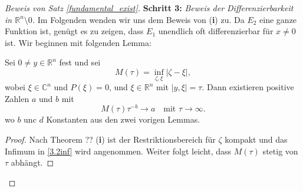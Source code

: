 \begin{proof}[Beweis von Satz \ref{fundamental_exist}]
\textbf{Schritt 3:} \emph{Beweis der Differenzierbarkeit in $\mathbb R^n\setminus{0}$.}
Im Folgenden wenden wir uns dem Beweis von ({\bf i}) zu. Da $E_2$ eine ganze Funktion ist, genügt es zu zeigen, dass $E_1$ unendlich oft differenzierbar für $x\neq 0$ ist.  Wir beginnen mit folgenden Lemma:
\begin{lem}\label{3.2lem1}
Sei $0\neq y \in \mathbb R^n$ fest und sei
\begin{equation}\label{3.2inf}
M(\tau) = \inf_{\zeta, \xi} |\zeta-\xi|,
\end{equation}
wobei $\xi\in \mathbb C^n$ und $P(\xi)=0$, und $\xi\in \mathbb R^n$ mit $|y, \xi|= \tau$. Dann existieren positive Zahlen $a$ und $b$ mit
\begin{equation}\label{3.2to}
M(\tau) \tau^{-b} \to a\quad \text{mit } \tau \to \infty.
\end{equation}
wo $b$ unc $d$ Konstanten aus den zwei vorigen Lemmas.
\end{lem}
\begin{proof}
Nach Theorem ?? ({\bf i}) ist der Restriktionsbereich für $\zeta$ kompakt und das Infimum in \ref{3.2inf} wird angenommen. Weiter folgt leicht, dass $M(\tau)$ stetig von $\tau$ abhängt.
\end{proof}
  




\end{proof}
